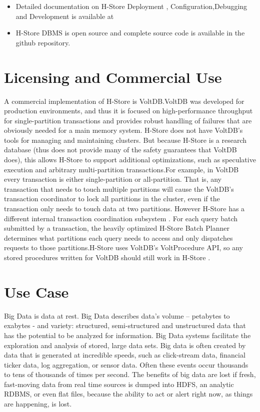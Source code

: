 \documentclass[9pt,twocolumn,twoside]{styles/osajnl}
\begin{document}
\begin{itemize}
\renewcommand{\labelitemi}{\scriptsize$\bullet$} 
\item Detailed documentation on H-Store  Deployment , Configuration,Debugging and Development is available at  \cite{www-H-Store}
\item H-Store DBMS is open source and complete source code is available in the  \cite{github-H-Store} github repository. 
\end{itemize}

\section{Licensing and Commercial Use}

A commercial implementation of H-Store is VoltDB.VoltDB was developed for production environments, and thus it is focused on high-performance throughput for single-partition transactions and provides robust handling of failures that are obviously needed for a main memory system. H-Store does not have VoltDB’s tools for managing and maintaining clusters. But because H-Store is a research database (thus does not provide many of the safety guarantees that VoltDB does), this allows H-Store to support additional optimizations, such as speculative execution and arbitrary multi-partition transactions.For example, in VoltDB every transaction is either single-partition or all-partition. That is, any transaction that needs to touch multiple partitions will cause the VoltDB’s transaction coordinator to lock all partitions in the cluster, even if the transaction only needs to touch data at two partitions. However H-Store has a different internal transaction coordination subsystem . For each query batch submitted by a transaction, the heavily optimized H-Store Batch Planner determines what partitions each query needs to access and only dispatches requests to those partitions.H-Store uses VoltDB’s VoltProcedure API, so any stored procedures written for VoltDB should still work in H-Store \cite{www-H-StoreFaq}. 


\section{Use Case}

Big Data is data at rest. Big Data describes data’s volume – petabytes to exabytes - and variety: structured, semi-structured and unstructured data that has the potential to be analyzed for information. Big Data systems facilitate the exploration and analysis of stored, large data sets.
Big data is often created by data that is generated at incredible speeds, such as click-stream data, financial ticker data, log aggregation, or sensor data. Often these events occur thousands to tens of thousands of times per second. The benefits of big data are lost if fresh, fast-moving data from real time sources is dumped into HDFS, an analytic RDBMS, or even flat files, because the ability to act or alert right now, as things are happening, is lost. 
\end{document}
